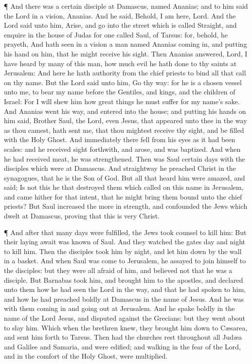  ¶ And there was a certain disciple at Damascus, named
Ananias; and to him said the Lord in a vision, Ananias. And he said,
Behold, I am here, Lord.  And the Lord said unto him,
Arise, and go into the street which is called Straight, and enquire in
the house of Judas for one called Saul, of Tarsus: for, behold, he
prayeth,  And hath seen in a vision a man named Ananias
coming in, and putting his hand on him, that he might receive his sight.
 Then Ananias answered, Lord, I have heard by many of this
man, how much evil he hath done to thy saints at Jerusalem:
 And here he hath authority from the chief priests to bind
all that call on thy name.  But the Lord said unto him, Go
thy way: for he is a chosen vessel unto me, to bear my name before the
Gentiles, and kings, and the children of Israel:  For I
will shew him how great things he must suffer for my name's sake.
 And Ananias went his way, and entered into the house; and
putting his hands on him said, Brother Saul, the Lord, even Jesus, that
appeared unto thee in the way as thou camest, hath sent me, that thou
mightest receive thy sight, and be filled with the Holy Ghost.
 And immediately there fell from his eyes as it had been
scales: and he received sight forthwith, and arose, and was baptized.
 And when he had received meat, he was strengthened. Then
was Saul certain days with the disciples which were at Damascus.
 And straightway he preached Christ in the synagogues, that
he is the Son of God.  But all that heard him were amazed,
and said; Is not this he that destroyed them which called on this name
in Jerusalem, and came hither for that intent, that he might bring them
bound unto the chief priests?  But Saul increased the more
in strength, and confounded the Jews which dwelt at Damascus, proving
that this is very Christ.

 ¶ And after that many days were fulfilled, the Jews took
counsel to kill him:  But their laying await was known of
Saul. And they watched the gates day and night to kill him.
 Then the disciples took him by night, and let him down by
the wall in a basket.  And when Saul was come to Jerusalem,
he assayed to join himself to the disciples: but they were all afraid of
him, and believed not that he was a disciple.  But Barnabas
took him, and brought him to the apostles, and declared unto them how he
had seen the Lord in the way, and that he had spoken to him, and how he
had preached boldly at Damascus in the name of Jesus.  And
he was with them coming in and going out at Jerusalem.  And
he spake boldly in the name of the Lord Jesus, and disputed against the
Grecians: but they went about to slay him.  Which when the
brethren knew, they brought him down to Cæsarea, and sent him forth to
Tarsus.  Then had the churches rest throughout all Judæa
and Galilee and Samaria, and were edified; and walking in the fear of
the Lord, and in the comfort of the Holy Ghost, were multiplied.

